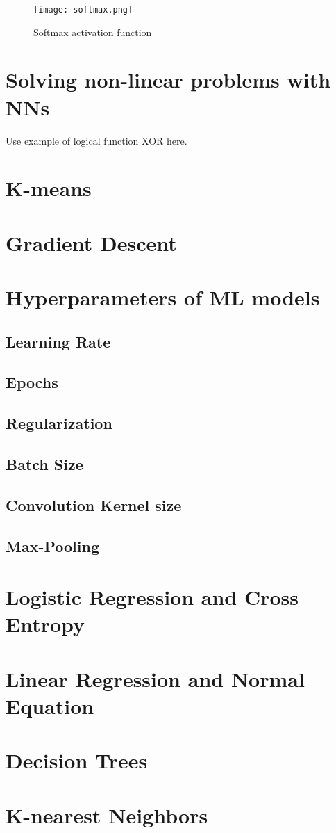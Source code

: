 \begin{figure}[h]
    \centering
    \texttt{[image: softmax.png]}
    \caption{Softmax activation function}
    \label{fig:softmax}
\end{figure}

\section{Solving non-linear problems with NNs}

\label{sec:solving_non_linear_problems_with_nns}

Use example of logical function XOR here.

\section{K-means}

\section{Gradient Descent}

\section{Hyperparameters of ML models}

\subsection{Learning Rate}
\subsection{Epochs}
\subsection{Regularization}
\subsection{Batch Size}
\subsection{Convolution Kernel size}
\subsection{Max-Pooling}

\section{Logistic Regression and Cross Entropy}


\section{Linear Regression and Normal Equation}


\section{Decision Trees}


\section{K-nearest Neighbors}

